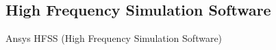 \subsection{High Frequency Simulation Software}

Ansys HFSS (High Frequency Simulation Software) %



